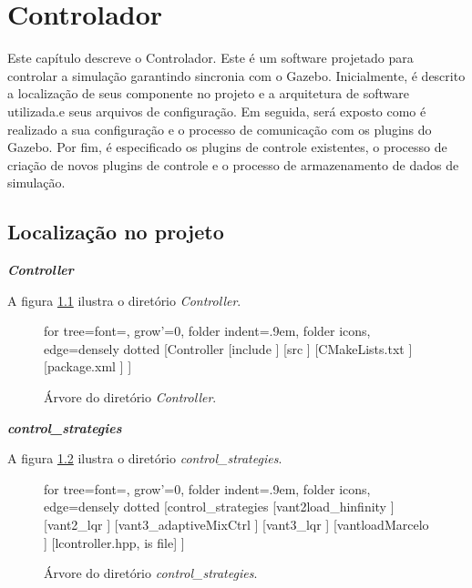\chapter{Controlador}

Este capítulo descreve o Controlador. Este é um software projetado para controlar a simulação garantindo sincronia com o Gazebo. Inicialmente, é descrito a localização de seus componente no projeto e a arquitetura de software utilizada.e seus arquivos de configuração. Em seguida, será exposto como é realizado a sua configuração e o processo de comunicação com os plugins do Gazebo. Por fim, é especificado os plugins de controle existentes, o processo de criação de novos plugins de controle e o processo de armazenamento de dados de simulação.

\section{Localização no projeto}


\textbf{\emph{Controller}}
\vspace{0.5em}

A figura \ref{fig:arvore_controller} ilustra o diretório \emph{Controller}.

\begin{tiny}
	\begin{figure}[htbp]
		\begin{forest}
			for tree={font=\sffamily, grow'=0,
				folder indent=.9em, folder icons,
				edge=densely dotted}
			[Controller
			[include
			]
			[src
			]
			[CMakeLists.txt
			]
			[package.xml
			]
			]
		\end{forest}
		\caption{Árvore do diretório \emph{Controller}.}
		\label{fig:arvore_controller}
	\end{figure}
\end{tiny}

\vspace{0.5em}
\noindent 
\textbf{\emph{control\_strategies}}
\vspace{0.5em}

A figura \ref{fig:arvore_control} ilustra o diretório \emph{control\_strategies}.

\begin{tiny}
	\begin{figure}[htbp]
		\begin{forest}
			for tree={font=\sffamily, grow'=0,
				folder indent=.9em, folder icons,
				edge=densely dotted}
			[control\_strategies
			[vant2load\_hinfinity
			]
			[vant2\_lqr
			]
			[vant3\_adaptiveMixCtrl
			]
			[vant3\_lqr
			]
			[vantloadMarcelo
			]
			[lcontroller.hpp, is file]
			]
		\end{forest}
		\caption{Árvore do diretório \emph{control\_strategies}.}
		\label{fig:arvore_control}
	\end{figure}
\end{tiny}


